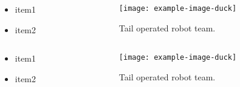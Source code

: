 \documentclass[t]{beamer}
\begin{document}
    \begin{frame}
        \begin{columns}
        \begin{column}{0.5\textwidth}
                \begin{itemize}
                    \item item1
                    \item item2
                \end{itemize}
            \end{column}
        \begin{column}{0.5\textwidth}
                \begin{figure}
                \texttt{[image: example-image-duck]}
                \caption{Tail operated robot team.}
            \end{figure}
        \end{column}
    \end{columns}
    \end{frame}

    \begin{frame}
        \begin{columns}
            \begin{column}{0.5\textwidth}
                \begin{itemize}
                    \item item1
                    \item item2
                \end{itemize}
            \end{column}
            \begin{column}{0.5\textwidth}
                \begin{figure}
                    \texttt{[image: example-image-duck]}
                    \caption{Tail operated robot team.}
                \end{figure}
            \end{column}
        \end{columns}
    \end{frame} 
\end{document}
